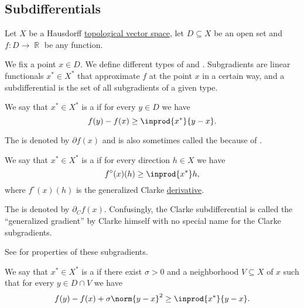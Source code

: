 \subsection{Subdifferentials}\label{subsec:subdifferentials}

Let \( X \) be a Hausdorff \hyperref[def:topological_vector_space]{topological vector space}, let \( D \subseteq X \) be an open set and \( f: D \to \BbbR \) be any function.

\begin{definition}\label{def:subdifferentials}
  We fix a point \( x \in D \). We define different types of  and . Subgradients are linear functionals \( x^* \in X^* \) that approximate \( f \) at the point \( x \) in a certain way, and a subdifferential is the set of all subgradients of a given type.

  \begin{thmenum}
    We say that \( x^* \in X^* \) is a  if for every \( y \in D \) we have
    \begin{equation*}
      f(y) - f(x) \geq \inprod {x^*} {y - x}.
    \end{equation*}

    The  is denoted by \( \partial f(x) \) and is also sometimes called the  because of .

    We say that \( x^* \in X^* \) is a  if for every direction \( h \in X \) we have
    \begin{equation*}
      f^\circ(x)(h) \geq \inprod {x^*} h,
    \end{equation*}
    where \( f^\circ(x)(h) \) is the generalized Clarke \hyperref[def:nonsmooth_derivatives/clarke]{derivative}.

    The  is denoted by \( \partial_C f(x) \). Confusingly, the Clarke subdifferential is called the \enquote{generalized gradient} by Clarke himself with no special name for the Clarke subgradients.

    See  for properties of these subgradients.

    We say that \( x^* \in X^* \) is a  if there exist \( \sigma > 0 \) and a neighborhood \( V \subseteq X \) of \( x \) such that for every \( y \in D \cap V \) we have
    \begin{equation*}
      f(y) - f(x) + \sigma \norm{y - x}^2 \geq \inprod {x^*} {y - x}.
    \end{equation*}


\end{thmenum}
\end{definition}
